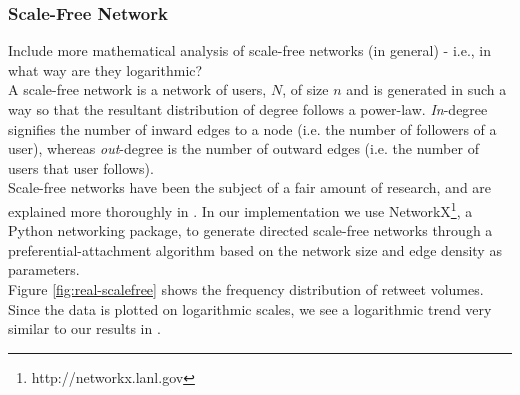 \subsubsection{Scale-Free Network}
Include more mathematical analysis of scale-free networks (in general) - i.e., in what way are they logarithmic?
\\
A scale-free network is a network of users, $ N $, of size $ n $ and is generated in such a way so that the resultant distribution of degree follows a power-law. \emph{In}-degree signifies the number of inward edges to a node (i.e. the number of followers of a user), whereas \emph{out}-degree is the number of outward edges (i.e. the number of users that user follows).
\\
Scale-free networks have been the subject of a fair amount of research, and are explained more thoroughly in \cite{hein06}. In our implementation we use NetworkX\footnote{http://networkx.lanl.gov}, a Python networking package, to generate directed scale-free networks through a preferential-attachment algorithm based on the network size and edge density as parameters.
\\
Figure \ref{fig:real-scalefree} shows the frequency distribution of retweet volumes. Since the data is plotted on logarithmic scales, we see a logarithmic trend very similar to our results in \cite{webberley11}.
%    

